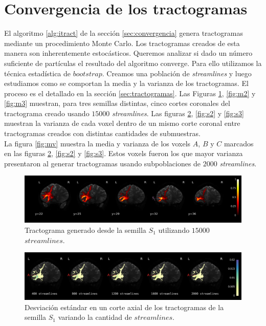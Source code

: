 \section{Convergencia de los tractogramas}
\label{sec:resultado_estabilidad}

El algoritmo \ref{alg:itract} de la secci\'on \ref{sec:convergencia} genera
tractogramas mediante un procedimiento Monte Carlo. Los tractogramas creados
de esta manera son inherentemente estoc\'asticos. Queremos analizar si dado
un n\'umero suficiente de part\'iculas el resultado del algoritmo converge.
Para ello utilizamos la t\'ecnica estad\'istica de $bootstrap$. Creamos una 
poblaci\'on de \textit{streamlines} y luego estudiamos como se comportan la
media y la varianza de los tractogramas. El proceso es el detallado en la
secci\'on \ref{sec:tractogramas}. Las Figuras \ref{fig:m1}, \ref{fig:m2} y 
\ref{fig:m3} muestran, para tres semillas distintas, cinco cortes coronales
del tractograma creado usando $15000$ \textit{streamlines}. Las figuras
\ref{fig:s1}, \ref{fig:s2} y \ref{fig:s3} muestran la varianza de cada
voxel dentro de un mismo corte coronal entre tractogramas creados con
distintas cantidades de submuestras. \\

La figura \ref{fig:mv} muestra la media y varianza de los voxels $A$, $B$ 
y $C$ marcados en las figuras \ref{fig:s1}, \ref{fig:s2} y \ref{fig:s3}.
Estos voxels fueron los que mayor varianza presentaron al generar
tractogramas usando subpoblaciones de $2000$ \textit{streamlines}.\\

\begin{figure}[h!]
   \centering
    \includegraphics[width=\textwidth]{img/m1.png}
    \caption{Tractograma generado desde la semilla $S_1$ utilizando $15000$
             $streamlines$.}
    \label{fig:m1}
\end{figure}

\begin{figure}[h!]
   \centering
    \includegraphics[width=\textwidth]{img/s1.png}
    \caption{Desviaci\'on est\'andar en un corte axial de los tractogramas
             de la semilla $S_1$ variando la cantidad de $streamlines$.}
    \label{fig:s1}
\end{figure}

